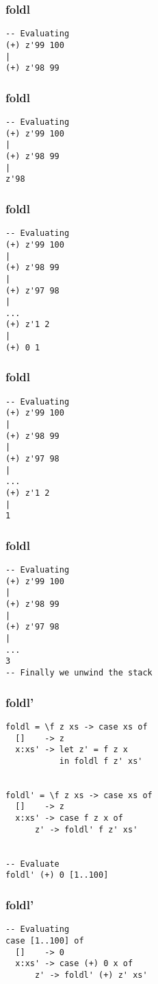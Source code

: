 \documentclass{beamer}
\begin{document}
\begin{frame}[t,fragile]
\frametitle{foldl}
\begin{verbatim}
-- Evaluating
(+) z'99 100
|
(+) z'98 99
\end{verbatim}
\end{frame}

\begin{frame}[t,fragile]
\frametitle{foldl}
\begin{verbatim}
-- Evaluating
(+) z'99 100
|
(+) z'98 99
|
z'98
\end{verbatim}
\end{frame}

\begin{frame}[t,fragile]
\frametitle{foldl}
\begin{verbatim}
-- Evaluating
(+) z'99 100
|
(+) z'98 99
|
(+) z'97 98
|
...
(+) z'1 2
|
(+) 0 1
\end{verbatim}
\end{frame}

\begin{frame}[t,fragile]
\frametitle{foldl}
\begin{verbatim}
-- Evaluating
(+) z'99 100
|
(+) z'98 99
|
(+) z'97 98
|
...
(+) z'1 2
|
1
\end{verbatim}
\end{frame}

\begin{frame}[t,fragile]
\frametitle{foldl}
\begin{verbatim}
-- Evaluating
(+) z'99 100
|
(+) z'98 99
|
(+) z'97 98
|
...
3
-- Finally we unwind the stack
\end{verbatim}
\end{frame}

\begin{frame}[t,fragile]
\frametitle{foldl'}
\begin{verbatim}
foldl = \f z xs -> case xs of
  []    -> z
  x:xs' -> let z' = f z x
           in foldl f z' xs'


foldl' = \f z xs -> case xs of
  []    -> z
  x:xs' -> case f z x of
      z' -> foldl' f z' xs'


-- Evaluate
foldl' (+) 0 [1..100]           
\end{verbatim}
\end{frame}

\begin{frame}[t,fragile]
\frametitle{foldl'}
\begin{verbatim}
-- Evaluating
case [1..100] of
  []    -> 0
  x:xs' -> case (+) 0 x of
      z' -> foldl' (+) z' xs'
\end{verbatim}
\end{frame}
\end{document}
